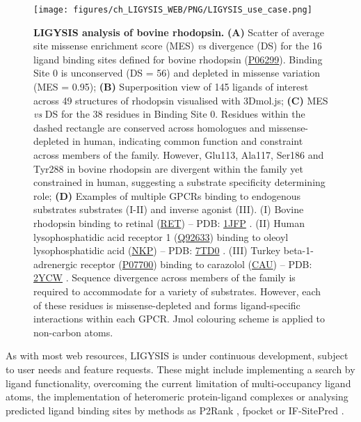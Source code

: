\begin{figure}[htbp!]
    \centering
    \texttt{[image: figures/ch\_LIGYSIS\_WEB/PNG/LIGYSIS\_use\_case.png]}
    \caption[LIGYSIS analysis of bovine rhodopsin]{\textbf{LIGYSIS analysis of bovine rhodopsin.} \textbf{(A)} Scatter of average site missense enrichment score (MES) \textit{vs}  divergence (DS) for the 16 ligand binding sites defined for bovine rhodopsin (\href{https://www.uniprot.org/uniprotkb/P06299/entry}{P06299}). Binding Site 0 is unconserved (DS = 56) and depleted in missense variation (MES = 0.95); \textbf{(B)} Superposition view of 145 ligands of interest across 49 structures of rhodopsin visualised with 3Dmol.js; \textbf{(C)} MES \textit{vs} DS for the 38 residues in Binding Site 0. Residues within the dashed rectangle are conserved across homologues and missense-depleted in human, indicating common function and constraint across members of the family. However, Glu113, Ala117, Ser186 and Tyr288 in bovine rhodopsin are divergent within the family yet constrained in human, suggesting a substrate specificity determining role; \textbf{(D)} Examples of multiple GPCRs binding to endogenous substrates substrates (I-II) and inverse agonist (III). (I) Bovine rhodopsin binding to retinal (\href{https://www.ebi.ac.uk/pdbe-srv/pdbechem/chemicalCompound/show/RET}{RET}) – PDB: \href{https://www.ebi.ac.uk/pdbe/entry/pdb/1jfp}{1JFP} \cite{YEAGLE_2001_GPCRs}. (II) Human lysophosphatidic acid receptor 1 (\href{https://www.uniprot.org/uniprotkb/Q92633/entry}{Q92633}) binding to oleoyl lysophosphatidic acid (\href{https://www.ebi.ac.uk/pdbe-srv/pdbechem/chemicalCompound/show/NKP}{NKP}) – PDB: \href{https://www.ebi.ac.uk/pdbe/entry/pdb/7TD0}{7TD0} \cite{LIU_2022_GPCRs}. (III) Turkey beta-1-adrenergic receptor (\href{https://www.uniprot.org/uniprotkb/P07700/entry}{P07700}) binding to carazolol (\href{https://www.ebi.ac.uk/pdbe-srv/pdbechem/chemicalCompound/show/CAU}{CAU}) – PDB: \href{https://www.ebi.ac.uk/pdbe/entry/pdb/2YCW}{2YCW} \cite{MOUKHAMETZIANOV_2011_GPCRs}. Sequence divergence across members of the family is required to accommodate for a variety of substrates. However, each of these residues is missense-depleted and forms ligand-specific interactions within each GPCR. Jmol colouring scheme \cite{JMOL} is applied to non-carbon atoms.}
    \label{fig:ligysis_rhodopsin}
\end{figure}

\newpage

As with most web resources, LIGYSIS is under continuous development, subject to user needs and feature requests. These might include implementing a search by ligand functionality, overcoming the current limitation of multi-occupancy ligand atoms, the implementation of heteromeric protein-ligand complexes or analysing predicted ligand binding sites by methods as P2Rank \cite{KRIVAK_2018_P2RANK}, fpocket \cite{GUILLOUX_2009_FPOCKET} or IF-SitePred \cite{CARBERY_2024_IFSP}.
